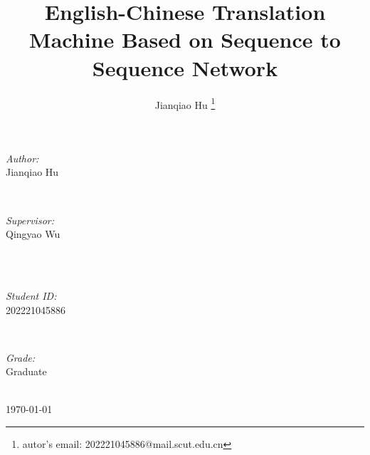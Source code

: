 \documentclass[journal, a4paper]{IEEEtran}
\begin{document}
\begin{titlepage}
\begin{minipage}{0.4\textwidth}
\begin{flushleft} \large
\emph{Author:}\\
Jianqiao Hu %
\end{flushleft}
\end{minipage}
~
\begin{minipage}{0.4\textwidth}
\begin{flushright} \large
\emph{Supervisor:} \\
Qingyao Wu
\end{flushright}
\end{minipage}\\[2cm]
~
\begin{minipage}{0.4\textwidth}
\begin{flushleft} \large
\emph{Student ID:}\\
202221045886
\end{flushleft}
\end{minipage}
~
\begin{minipage}{0.4\textwidth}
\begin{flushright} \large
\emph{Grade:} \\
Graduate
\end{flushright}
\end{minipage}\\[2cm]



{\large \today}\\[2cm] %

 

\vfill %

\end{titlepage}


	\title{English-Chinese Translation Machine Based on Sequence to Sequence Network}
	\author{Jianqiao Hu \thanks{autor's email: 202221045886@mail.scut.edu.cn}}
	\maketitle
\end{document}
